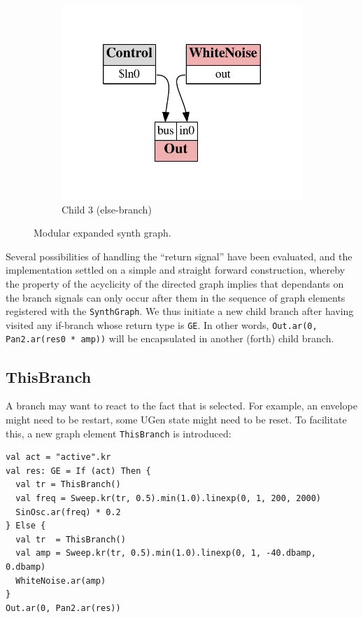 \documentclass[11pt,a4paper]{article}
\begin{document}
\begin{figure}
\begin{subfigure}[b]{0.3\textwidth}
\includegraphics[scale=0.5]{figures/ugen-if-mod-child_3.pdf}
\caption{Child 3 (else-branch)}\label{fig:ugen-mod-c3}
\end{subfigure}
\caption{Modular expanded synth graph.}
\label{fig:ugen-modular}
\end{figure}

Several possibilities of handling the ``return signal'' have been evaluated, and the implementation settled on a simple and straight forward construction, whereby the property of the acyclicity of the directed graph implies that dependants on the branch signals can only occur after them in the sequence of graph elements registered with the \Verb!SynthGraph!. We thus initiate a new child branch after having visited any if-branch whose return type is \Verb!GE!. In other words, \Verb!Out.ar(0, Pan2.ar(res0 * amp))! will be encapsulated in another (forth) child branch.

\newpage
\subsection{ThisBranch}

A branch may want to react to the fact that is selected. For example, an envelope might need to be restart, some UGen state might need to be reset. To facilitate this, a new graph element \Verb!ThisBranch! is introduced:
%
\begin{verbatim}
val act = "active".kr
val res: GE = If (act) Then {
  val tr = ThisBranch()
  val freq = Sweep.kr(tr, 0.5).min(1.0).linexp(0, 1, 200, 2000)
  SinOsc.ar(freq) * 0.2
} Else {
  val tr  = ThisBranch()
  val amp = Sweep.kr(tr, 0.5).min(1.0).linexp(0, 1, -40.dbamp, 0.dbamp)
  WhiteNoise.ar(amp)
}
Out.ar(0, Pan2.ar(res))
\end{verbatim}
\end{document}
